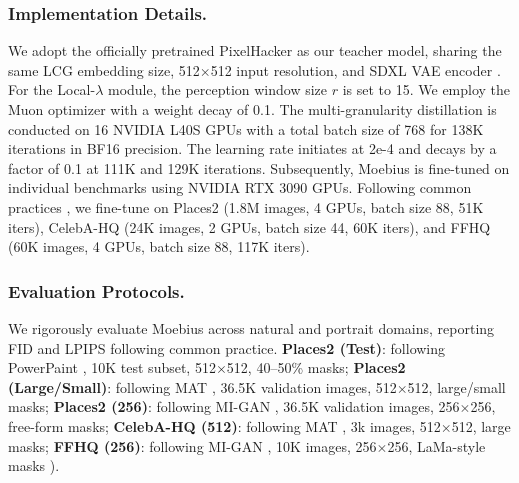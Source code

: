 \documentclass[runningheads]{llncs}
\begin{document}
\subsubsection{Implementation Details.}\label{subsubsec:impl}
We adopt the officially pretrained PixelHacker \cite{xu2025pixelhacker} as our teacher model, sharing the same LCG embedding size, 512$\times$512 input resolution, and SDXL VAE encoder \cite{podell2023sdxl}. For the Local-$\lambda$ module, the perception window size $r$ is set to 15. We employ the Muon optimizer \cite{jordan2024muon, kimiteam2025kimik2} with a weight decay of 0.1. 
The multi-granularity distillation is conducted on 16 NVIDIA L40S GPUs with a total batch size of 768 for 138K iterations in BF16 precision. The learning rate initiates at 2e-4 and decays by a factor of 0.1 at 111K and 129K iterations. Subsequently, Moebius is fine-tuned on individual benchmarks using NVIDIA RTX 3090 GPUs. Following common practices \cite{suvorov2021lama, Sargsyan2023migan, li2022mat}, we fine-tune on Places2 \cite{zhou2017places} (1.8M images, 4 GPUs, batch size 88, 51K iters), CelebA-HQ \cite{karras2018celebahq} (24K images, 2 GPUs, batch size 44, 60K iters), and FFHQ \cite{karras2018stylegan_ffhq} (60K images, 4 GPUs, batch size 88, 117K iters). 

\vspace{-1em}
\vspace{-0.4em}
\subsubsection{Evaluation Protocols.}\label{subsubsec:compare_details}
We rigorously evaluate Moebius across natural \cite{zhou2017places} and portrait \cite{karras2018stylegan_ffhq, karras2018celebahq} domains, reporting FID \cite{huesel2017FID} and LPIPS \cite{zhang2018lpips} following common practice.
\textbf{Places2 (Test)}: following PowerPaint \cite{zhuang2023powerpaint}, 10K test subset, 512$\times$512, 40–50\% masks;
\textbf{Places2 (Large/Small)}: following MAT \cite{li2022mat}, 36.5K validation images, 512$\times$512, large/small masks;
\textbf{Places2 (256)}: following MI-GAN \cite{Sargsyan2023migan}, 36.5K validation images, 256$\times$256, free-form masks;
\textbf{CelebA-HQ (512)}: following MAT \cite{li2022mat}, 3k images, 512$\times$512, large masks;
\textbf{FFHQ (256)}: following MI-GAN \cite{Sargsyan2023migan}, 10K images, 256$\times$256, LaMa-style masks \cite{suvorov2021lama}). 


\vspace{-1em}
\vspace{-0.4em}
\end{document}
